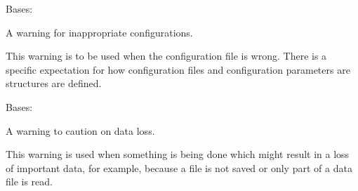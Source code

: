 \documentclass[letterpaper,11pt,english]{sphinxmanual}
\begin{document}
\begin{savenotes}\begin{fulllineitems}
\label{\detokenize{code/lezargus.library.logging:lezargus.library.logging.ConfigurationWarning}}
\pysigstartsignatures
{}
\pysigstopsignatures
\sphinxAtStartPar
Bases: {\hyperref[\detokenize{code/lezargus.library.logging:lezargus.library.logging.LezargusWarning}]{}}

\sphinxAtStartPar
A warning for inappropriate configurations.

\sphinxAtStartPar
This warning is to be used when the configuration file is wrong. There is a
specific expectation for how configuration files and configuration
parameters are structures are defined.

\end{fulllineitems}\end{savenotes}


\begin{savenotes}\begin{fulllineitems}
\label{\detokenize{code/lezargus.library.logging:lezargus.library.logging.DataLossWarning}}
\pysigstartsignatures
{}
\pysigstopsignatures
\sphinxAtStartPar
Bases: {\hyperref[\detokenize{code/lezargus.library.logging:lezargus.library.logging.LezargusWarning}]{}}

\sphinxAtStartPar
A warning to caution on data loss.

\sphinxAtStartPar
This warning is used when something is being done which might result in
a loss of important data, for example, because a file is not saved or
only part of a data file is read.

\end{fulllineitems}\end{savenotes}

\end{document}
